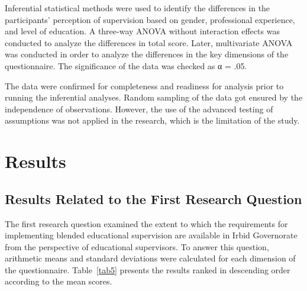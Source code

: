 \documentclass[10pt]{NSP1}
\begin{document}
Inferential statistical methods were used to identify the differences in the participants' perception of supervision based on gender, professional experience, and level of education. A three-way ANOVA without interaction effects was conducted to analyze the differences in total score. Later, multivariate ANOVA was conducted in order to analyze the differences in the key dimensions of the questionnaire. The significance of the data was checked as α = .05.

The data were confirmed for completeness and readiness for analysis prior to running the inferential analyses. Random sampling of the data got ensured by the independence of observations. However, the use of the advanced testing of assumptions was not applied in the research, which is the limitation of the study.

\section{Results}

\subsection{Results Related to the First Research Question}

The first research question examined the extent to which the requirements for implementing blended educational supervision are available in Irbid Governorate from the perspective of educational supervisors. To answer this question, arithmetic means and standard deviations were calculated for each dimension of the questionnaire. Table~\ref{tab5} presents the results ranked in descending order according to the mean scores.
\end{document}
